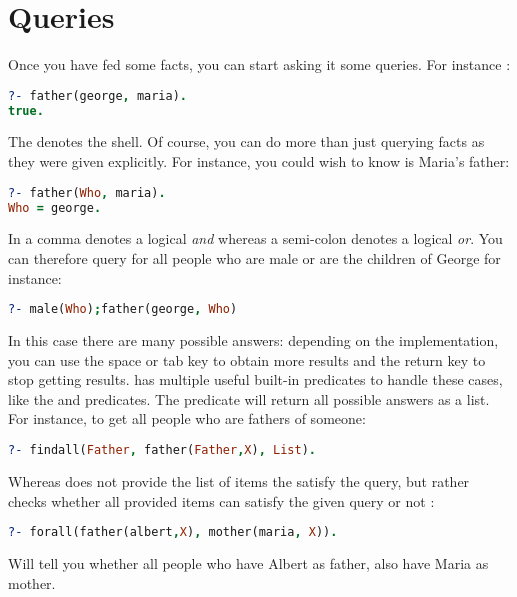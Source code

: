 \documentclass{../../../tp}
\begin{document}
\section{Queries}
 
Once you have fed \prolog some facts, you can start asking it some queries. For instance :

\begin{lstlisting}[language=prolog]
?- father(george, maria).
true.
\end{lstlisting}

The  denotes the \prolog shell. Of course, you can do more than just querying facts as they were given explicitly. For instance, you could wish to know is Maria's father:

\begin{lstlisting}[language=prolog]
?- father(Who, maria).
Who = george.
\end{lstlisting}

In \prolog a comma \prologcode{,} denotes a logical \emph{and} whereas a semi-colon denotes a logical \emph{or}. You can therefore query for all people who are male or are the children of George for instance:

\begin{lstlisting}[language=prolog]
?- male(Who);father(george, Who)
\end{lstlisting}

In this case there are many possible answers: depending on the implementation, you can use the space or tab key to obtain more results and the return key to stop getting results. \prolog has multiple useful built-in predicates to handle these cases, like the  and  predicates. The  predicate will return all possible answers as a list. For instance, to get all people who are fathers of someone:

\begin{lstlisting}[language=prolog]
?- findall(Father, father(Father,X), List).
\end{lstlisting}

Whereas  does not provide the list of items the satisfy the query, but rather checks whether all provided items can satisfy the given query or not :

\begin{lstlisting}[language=prolog]
?- forall(father(albert,X), mother(maria, X)).
\end{lstlisting}

Will tell you whether all people who have Albert as father, also have Maria as mother.
\end{document}
